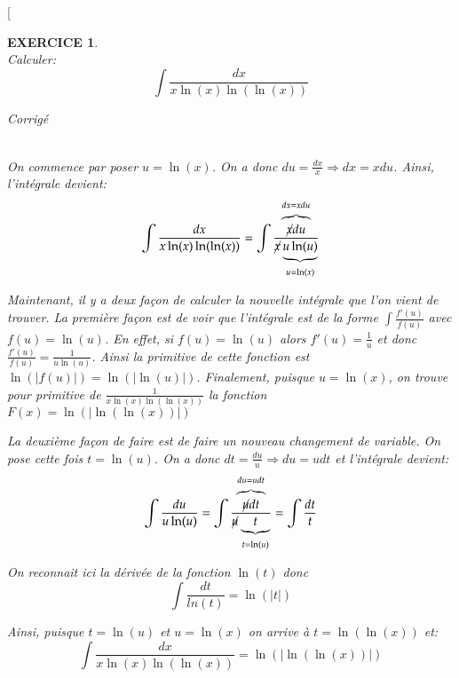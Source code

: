 \documentclass{article}%
\newtheorem{Exc}{EXERCICE}
\def\exo#1{%
  \futurelet\testchar\MaybeOptArgmyexoo}
\def\MaybeOptArgmyexoo{
  \ifx[\testchar \let\next\OptArgmyexoo
  \else \let\next\NoOptArgmyexoo \fi \next}
\def\OptArgmyexoo[#1]{%
  \begin{Exc}[#1]\normalfont}
\def\NoOptArgmyexoo{%
    \begin{Exc}\normalfont}
\newcommand{\finexo}{\end{Exc}}
\newif\ifprof
\begin{document}
\exo{}
~\\
Calculer: 
\[
  \int \frac{dx}{x \ln(x) \ln(\ln(x))} 
\]
\ifprof\par
\emph{Corrigé}\par
\begin{correction}
  ~\\
  On commence par poser $u=\ln(x)$. On a donc $du=\frac{dx}{x} \Rightarrow dx =
  x du$. Ainsi, l'intégrale devient:
  \[
    \int \frac{dx}{x \ln(x) \ln(\ln(x))} =
    \int \frac{\overbrace{\cancel{x} du}^{dx = xdu}}{\cancel{x} \underbrace{u \ln(u)}_{u = \ln(x)}} 
  \]
  
  Maintenant, il y a deux façon de calculer la nouvelle intégrale que l'on vient
  de trouver. La première façon est de voir que l'intégrale est de la forme
  $\int \frac{f'(u)}{f(u)}$ avec $f(u) = \ln(u)$. En effet, si $f(u) = \ln(u)$
  alors $f'(u) = \frac{1}{u}$ et donc $\frac{f'(u)}{f(u)} =
  \frac{1}{u\ln(u)}$. Ainsi la primitive de cette fonction est $\ln(|f(u)|) =
  \ln(|\ln(u)|)$. Finalement, puisque $u=\ln(x)$, on trouve pour primitive de
  $\frac{1}{x\ln(x) \ln(\ln(x))}$ la fonction $F(x) = \ln(|\ln(\ln(x))|)$

  La deuxième façon de faire est de faire un nouveau changement de variable. On
  pose cette fois $t=\ln(u)$. On a donc $dt=\frac{du}{u} \Rightarrow du =
  u dt$ et l'intégrale
  devient:
  \[
    \int \frac{du}{u \ln(u)} =
   \int \frac{\overbrace{\cancel{u} dt}^{du = udt}}{\cancel{u} \underbrace{t}_{t
       = \ln(u)}}
   = \int \frac{dt}{t}
 \]

 On reconnait ici la dérivée de la fonction $\ln(t)$ donc
 \[
   \int \frac{dt}{ln(t)} = \ln(|t|)
 \]

 Ainsi, puisque $t = \ln(u)$ et $u = \ln(x)$ on arrive à $t = \ln(\ln(x))$ et:
 \[
    \int \frac{dx}{x \ln(x) \ln(\ln(x))} = \ln(|\ln(\ln(x))|)
 \]
\end{correction}
\finexo

\newpage
\setcounter{page}{1}
\end{document}
